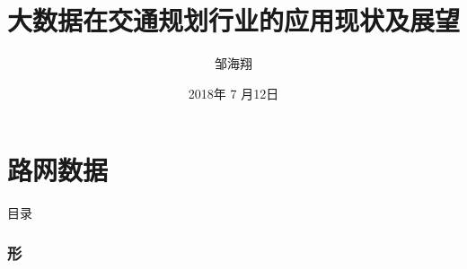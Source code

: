 \documentclass{beamerthemeMono}
\begin{document}
\title[大数据在交通规划行业的应用现状及展望]%
{\heiti \xiaoerhao 大数据在交通规划行业的应用现状及展望}


\author[邹海翔] %
{\xiaosihao 邹海翔}
\date{\xiaosihao 2018年 7 月12日}





\begin{frame}[plain]
  \titlepage
\end{frame}



\part{路网数据}

\begin{frame}{目录}{}
   {\tableofcontents[hideallsubsections]}
\end{frame}


\section{形}
\end{document}
